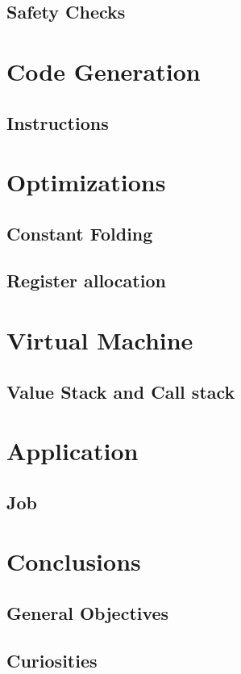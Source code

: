 \subsection{Safety Checks}

\section{Code Generation}
\subsection{Instructions}

\section{Optimizations}
\subsection{Constant Folding}

\subsection{Register allocation}

\section{Virtual Machine}
\subsection{Value Stack and Call stack}

\section{Application}
\subsection{Job}

\section{Conclusions}
\subsection{General Objectives}

\subsection{Curiosities}



